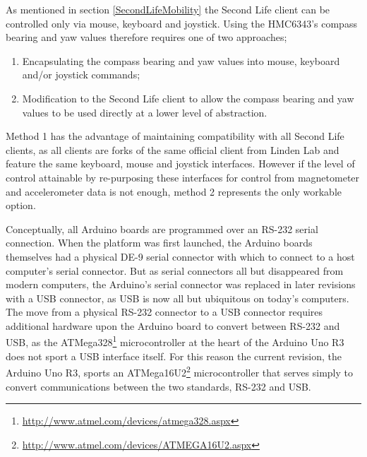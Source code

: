 \label{exploitJoystick}

\newcommand{\ArduinoJoystickVideoFootnote}{\footnote{\url{https://www.youtube.com/watch?v=-ddtmqoGNmg}}}

\newcommand{\atmegaFootnote}{\footnote{\url{http://www.atmel.com/devices/ATMEGA16U2.aspx}}}

\newcommand{\atmegaTFootnote}{\footnote{\url{http://www.atmel.com/devices/atmega328.aspx}}}

\newcommand{\arduinousbhidFootnote}{\footnote{\url{http://hunt.net.nz/users/darran/weblog/a3599/}}}

\newcommand{\lufaFootnote}{\footnote{\url{http://www.fourwalledcubicle.com/LUFA.php}}}


As mentioned in section \ref{SecondLifeMobility} the Second Life client can be controlled only via mouse, keyboard and joystick. Using the HMC6343's compass bearing and yaw values therefore requires one of two approaches;

\begin{enumerate}
	\item Encapsulating the compass bearing and yaw values into mouse, keyboard and/or joystick commands;
	\item Modification to the Second Life client to allow the compass bearing and yaw values to be used directly at a lower level of abstraction.
\end{enumerate}

Method 1 has the advantage of maintaining compatibility with all Second Life clients, as all clients are forks of the same official client from Linden Lab and feature the same keyboard, mouse and joystick interfaces. However if the level of control attainable by re-purposing these interfaces for control from magnetometer and accelerometer data is not enough, method 2 represents the only workable option.

Conceptually, all Arduino boards are programmed over an RS-232 serial connection. When the platform was first launched, the Arduino boards themselves had a physical DE-9 serial connector with which to connect to a host computer's serial connector. But as serial connectors all but disappeared from modern computers, the Arduino's serial connector was replaced in later revisions with a USB connector, as USB is now all but ubiquitous on today's computers. The move from a physical RS-232 connector to a USB connector requires additional hardware upon the Arduino board to convert between RS-232 and USB, as the ATMega328\atmegaTFootnote{} microcontroller at the heart of the Arduino Uno R3 does not sport a USB interface itself. For this reason the current revision, the Arduino Uno R3, sports an ATMega16U2\atmegaFootnote{} microcontroller that serves simply to convert communications between the two standards, RS-232 and USB.

